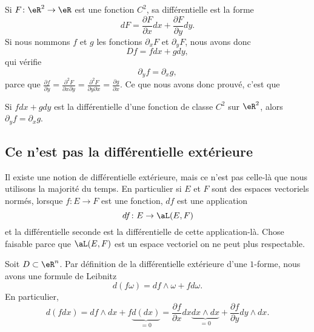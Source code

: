 \begin{example}
	Si \( F\colon \eR^2\to \eR\) est une fonction \( C^2\), sa différentielle est la forme
	\begin{equation}
		dF=\frac{ \partial F }{ \partial x }dx+\frac{ \partial F }{ \partial y }dy.
	\end{equation}
	Si nous nommons \( f\) et \( g\) les fonctions \( \partial_xF\) et \( \partial_yF\), nous avons donc
	\begin{equation}
		Df=fdx+gdy,
	\end{equation}
	qui vérifie
	\begin{equation}
		\partial_yf=\partial_xg,
	\end{equation}
	parce que \( \frac{ \partial f }{ \partial y }=\frac{ \partial^2F  }{ \partial x\partial y }=\frac{ \partial^2F  }{ \partial y\partial x }=\frac{ \partial g }{ \partial x }\). Ce que nous avons donc prouvé, c'est que
\end{example}

\begin{lemma}
	Si \( fdx+gdy\) est la différentielle d'une fonction de classe \( C^2\) sur \( \eR^2\), alors \( \partial_yf=\partial_xg\).
\end{lemma}

\subsection{Ce n'est pas la différentielle extérieure}

Il existe une notion de différentielle extérieure, mais ce n'est pas celle-là que nous utilisons la majorité du temps. En particulier si \( E\) et \( F\) sont des espaces vectoriels normés, lorsque \( f\colon E\to F\) est une fonction, \( df\) est une application
\begin{equation}
	df\colon E\to \aL(E,F)
\end{equation}
et la différentielle seconde est la différentielle de cette application-là. Chose faisable parce que \( \aL(E,F)\) est un espace vectoriel on ne peut plus respectable.

Soit \( D\subset\eR^n\). Par définition de la différentielle extérieure d'une \( 1\)-forme, nous avons une formule de Leibnitz
\begin{equation}
	d(f\omega)=df\wedge\omega+fd\omega.
\end{equation}
En particulier,
\begin{equation}
	d(fdx)=df\wedge dx+f\underbrace{d(dx)}_{=0}=\frac{ \partial f }{ \partial x }dx\underbrace{dx\wedge dx}_{=0}+\frac{ \partial f }{ \partial y }dy\wedge dx.
\end{equation}

